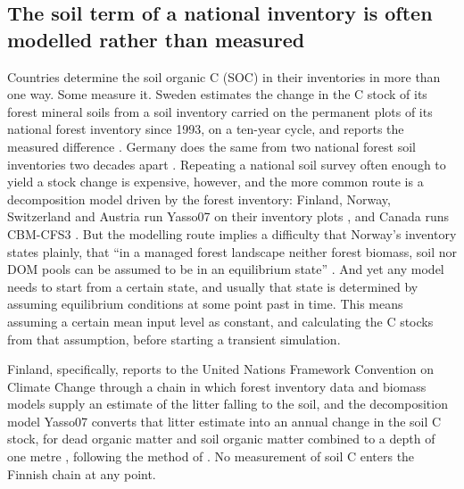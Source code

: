 \documentclass[11pt]{article}
\begin{document}
\subsection{The soil term of a national inventory is often modelled rather than measured}
Countries determine the soil organic C (SOC) in their inventories in more than one way. Some
measure it. Sweden estimates the change in the C stock of its forest mineral soils
from a soil inventory carried on the permanent plots of its national forest inventory
since 1993, on a ten-year cycle, and reports the measured difference
\citep{SwedenNID2026}. Germany does the same from two national forest soil inventories
two decades apart \citep{Gruneberg2014}. Repeating a national soil survey often
enough to yield a stock change is expensive, however, and the more common route is a
decomposition model driven by the forest inventory: Finland, Norway, Switzerland and
Austria run Yasso07 on their inventory plots \citep{StatFin2025NID,NorwayNID2025,Didion2016},
and Canada runs CBM-CFS3 \citep{Kurz2009}. But the modelling route implies a difficulty
that Norway's inventory states plainly, that ``in a managed forest landscape neither
forest biomass, soil nor DOM pools can be assumed to be in an equilibrium state''
\citep{NorwayNID2025}. And yet any model needs to start from a certain state, and usually that state is determined by assuming equilibrium conditions at some point past in time. This means assuming a certain mean input level as constant, and calculating the C stocks from that assumption, before starting a transient simulation.

Finland, specifically, reports to the United Nations Framework Convention on Climate Change through a chain in which forest inventory data and biomass models supply an estimate of the litter falling
to the soil, and the decomposition model Yasso07 converts that litter estimate into an annual change in the soil C stock, for dead organic matter and soil organic matter combined to a depth of one metre \citep{StatFin2024NID}, following the method of \citet{Liski2006}. No measurement of soil C enters the Finnish chain at any point.
\end{document}

